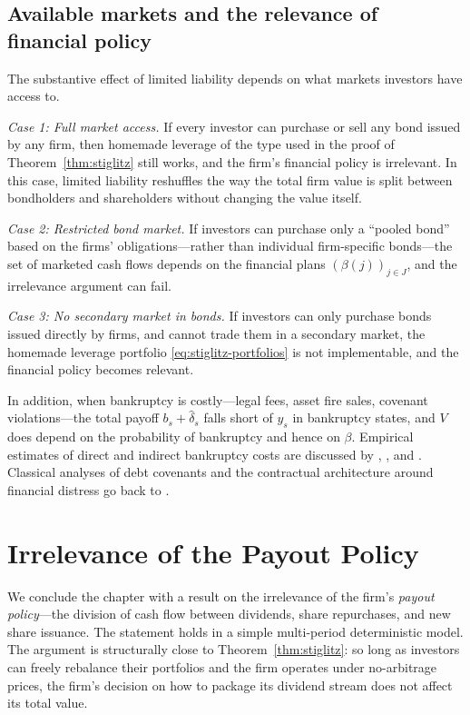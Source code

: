 \documentclass[11pt,a4paper,oneside]{book}
\theoremstyle{plain}
\theoremstyle{definition}
\theoremstyle{remark}
\numberwithin{equation}{chapter}
\begin{document}
\subsection{Available markets and the relevance of financial policy}

The substantive effect of limited liability depends on what markets investors have access to.

\emph{Case 1: Full market access.}
If every investor can purchase or sell any bond issued by any firm, then homemade leverage of the type used in the proof of Theorem~\ref{thm:stiglitz} still works, and the firm's financial policy is irrelevant.
In this case, limited liability reshuffles the way the total firm value is split between bondholders and shareholders without changing the value itself.

\emph{Case 2: Restricted bond market.}
If investors can purchase only a ``pooled bond'' based on the firms' obligations---rather than individual firm-specific bonds---the set of marketed cash flows depends on the financial plans $(\beta(j))_{j \in J}$, and the irrelevance argument can fail.

\emph{Case 3: No secondary market in bonds.}
If investors can only purchase bonds issued directly by firms, and cannot trade them in a secondary market, the homemade leverage portfolio \eqref{eq:stiglitz-portfolios} is not implementable, and the financial policy becomes relevant.

In addition, when bankruptcy is costly---legal fees, asset fire sales, covenant violations---the total payoff $b_s + \widehat{\delta}_s$ falls short of $y_s$ in bankruptcy states, and $V$ does depend on the probability of bankruptcy and hence on $\beta$.
Empirical estimates of direct and indirect bankruptcy costs are discussed by \citet{Weiss1990}, \citet{OplerTitman1994}, and \citet{Purnanandam2008}.
Classical analyses of debt covenants and the contractual architecture around financial distress go back to \citet{SmithWarner1979}.

\section{Irrelevance of the Payout Policy}
\label{sec:payout}

We conclude the chapter with a result on the irrelevance of the firm's \emph{payout policy}---the division of cash flow between dividends, share repurchases, and new share issuance.
The statement holds in a simple multi-period deterministic model.
The argument is structurally close to Theorem~\ref{thm:stiglitz}: so long as investors can freely rebalance their portfolios and the firm operates under no-arbitrage prices, the firm's decision on how to package its dividend stream does not affect its total value.
\end{document}
